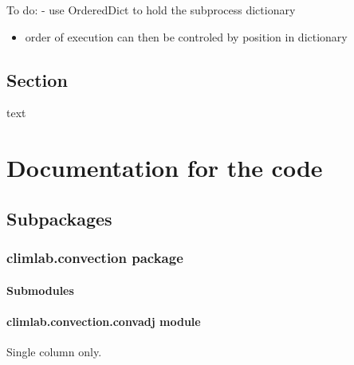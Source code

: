 \documentclass[letterpaper,10pt,english]{sphinxmanual}
\begin{document}
To do:
- use OrderedDict to hold the subprocess dictionary
\begin{itemize}
\item {} 
order of execution can then be controled by position in dictionary

\end{itemize}


\section{Section}
\label{tutorial:section}
text


\chapter{Documentation for the code}
\label{api/climlab::doc}\label{api/climlab:module-climlab}\label{api/climlab:documentation-for-the-code}

\section{Subpackages}
\label{api/climlab:subpackages}

\subsection{climlab.convection package}
\label{api/climlab.convection:climlab-convection-package}\label{api/climlab.convection::doc}

\subsubsection{Submodules}
\label{api/climlab.convection:submodules}

\subsubsection{climlab.convection.convadj module}
\label{api/climlab.convection:module-climlab.convection.convadj}\label{api/climlab.convection:climlab-convection-convadj-module}

\begin{fulllineitems}
\label{api/climlab.convection:climlab.convection.convadj.Akamaev_adjustment}
Single column only.

\end{fulllineitems}
\end{document}
